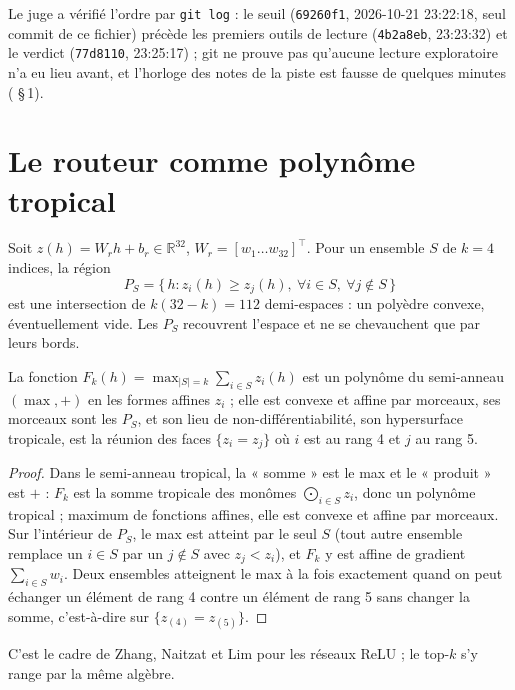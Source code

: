 Le juge a vérifié l'ordre par \texttt{git log} : le seuil (\texttt{69260f1}, 2026-10-21 23:22:18, seul commit de ce fichier) précède les premiers outils de lecture (\texttt{4b2a8eb}, 23:23:32) et le verdict (\texttt{77d8110}, 23:25:17) ; git ne prouve pas qu'aucune lecture exploratoire n'a eu lieu avant, et l'horloge des notes de la piste est fausse de quelques minutes ( §\,1).

\section{Le routeur comme polynôme tropical}\label{t3tro:sec:tropical}

Soit $z(h) = W_r h + b_r \in \mathbb{R}^{32}$, $W_r = [w_1 \dots w_{32}]^\top$. Pour un ensemble $S$ de $k = 4$ indices, la région
\begin{equation}\label{t3tro:eq:region}
P_S = \{\, h : z_i(h) \ge z_j(h),\ \forall i \in S,\ \forall j \notin S \,\}
\end{equation}
est une intersection de $k(32 - k) = 112$ demi-espaces : un polyèdre convexe, éventuellement vide. Les $P_S$ recouvrent l'espace et ne se chevauchent que par leurs bords.

\begin{proposition}\label{t3tro:prop:tropical}
La fonction $F_k(h) = \max_{|S| = k} \sum_{i \in S} z_i(h)$ est un polynôme du semi-anneau $(\max, +)$ en les formes affines $z_i$ ; elle est convexe et affine par morceaux, ses morceaux sont les $P_S$, et son lieu de non-différentiabilité, son hypersurface tropicale, est la réunion des faces $\{z_i = z_j\}$ où $i$ est au rang 4 et $j$ au rang 5.
\end{proposition}
\begin{proof}
Dans le semi-anneau tropical, la « somme » est le max et le « produit » est $+$ : $F_k$ est la somme tropicale des monômes $\bigodot_{i \in S} z_i$, donc un polynôme tropical ; maximum de fonctions affines, elle est convexe et affine par morceaux. Sur l'intérieur de $P_S$, le max est atteint par le seul $S$ (tout autre ensemble remplace un $i \in S$ par un $j \notin S$ avec $z_j < z_i$), et $F_k$ y est affine de gradient $\sum_{i\in S} w_i$. Deux ensembles atteignent le max à la fois exactement quand on peut échanger un élément de rang 4 contre un élément de rang 5 sans changer la somme, c'est-à-dire sur $\{z_{(4)} = z_{(5)}\}$.
\end{proof}
C'est le cadre de Zhang, Naitzat et Lim pour les réseaux ReLU \cite{zhang2018tropical} ; le top-$k$ s'y range par la même algèbre.

